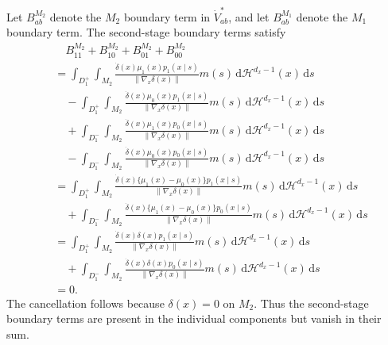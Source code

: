 \documentclass[12pt]{article}
\newcommand{\1}{\mathbf{1}}
\begin{document}
Let $B_{ab}^{M_2}$ denote the $M_2$ boundary term in $\dot V_{ab}^*$, and
let $B_{ab}^{M_1}$ denote the $M_1$ boundary term. The second-stage boundary
terms satisfy
\begin{align*}
&\quad
B_{11}^{M_2}+B_{10}^{M_2}+B_{01}^{M_2}+B_{00}^{M_2} \\
&=
\int_{D_1^+}\int_{M_2}
\frac{\dot\delta(x)\mu_1(x)p_1(x\mid s)}
{\lVert\nabla_x\delta(x)\rVert}
m(s)\,\mathrm d\mathcal H^{d_x-1}(x)\,\mathrm ds \\
&\quad-
\int_{D_1^+}\int_{M_2}
\frac{\dot\delta(x)\mu_0(x)p_1(x\mid s)}
{\lVert\nabla_x\delta(x)\rVert}
m(s)\,\mathrm d\mathcal H^{d_x-1}(x)\,\mathrm ds \\
&\quad+
\int_{D_1^-}\int_{M_2}
\frac{\dot\delta(x)\mu_1(x)p_0(x\mid s)}
{\lVert\nabla_x\delta(x)\rVert}
m(s)\,\mathrm d\mathcal H^{d_x-1}(x)\,\mathrm ds \\
&\quad-
\int_{D_1^-}\int_{M_2}
\frac{\dot\delta(x)\mu_0(x)p_0(x\mid s)}
{\lVert\nabla_x\delta(x)\rVert}
m(s)\,\mathrm d\mathcal H^{d_x-1}(x)\,\mathrm ds \\
&=
\int_{D_1^+}\int_{M_2}
\frac{\dot\delta(x)\{\mu_1(x)-\mu_0(x)\}p_1(x\mid s)}
{\lVert\nabla_x\delta(x)\rVert}
m(s)\,\mathrm d\mathcal H^{d_x-1}(x)\,\mathrm ds \\
&\quad+
\int_{D_1^-}\int_{M_2}
\frac{\dot\delta(x)\{\mu_1(x)-\mu_0(x)\}p_0(x\mid s)}
{\lVert\nabla_x\delta(x)\rVert}
m(s)\,\mathrm d\mathcal H^{d_x-1}(x)\,\mathrm ds \\
&=
\int_{D_1^+}\int_{M_2}
\frac{\dot\delta(x)\delta(x)p_1(x\mid s)}
{\lVert\nabla_x\delta(x)\rVert}
m(s)\,\mathrm d\mathcal H^{d_x-1}(x)\,\mathrm ds \\
&\quad+
\int_{D_1^-}\int_{M_2}
\frac{\dot\delta(x)\delta(x)p_0(x\mid s)}
{\lVert\nabla_x\delta(x)\rVert}
m(s)\,\mathrm d\mathcal H^{d_x-1}(x)\,\mathrm ds \\
&=0.
\end{align*}
The cancellation follows because $\delta(x)=0$ on $M_2$. Thus the
second-stage boundary terms are present in the individual components but
vanish in their sum.
\end{document}
